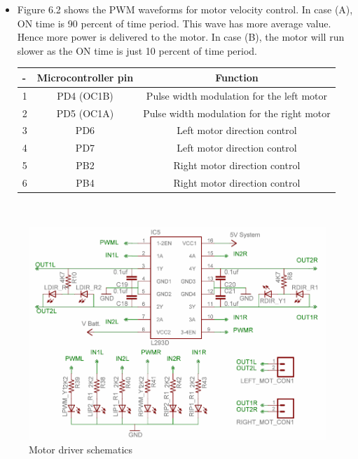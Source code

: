 \documentclass[a4paper,12pt,oneside]{book}
\begin{document}
	\begin{itemize}
	\item {Figure 6.2 shows the PWM waveforms for motor velocity control. In case (A), ON time is 90 percent of time period. This wave has more average value. Hence more power is delivered to the
	motor. In case (B), the motor will run slower as the ON time is just 10 percent of time period.}

	\begin{tabular*}{\textwidth}{|l|c|c|}
	\hline
	- & Microcontroller pin & Function \\
	\hline
	1 & PD4 (OC1B) & Pulse width modulation for the left motor\\
	\hline
	2 & PD5 (OC1A) & Pulse width modulation for the right motor\\
	\hline
	3 & PD6 & Left motor direction control \\
	\hline
	4 & PD7 & Left motor direction control \\
	\hline
	5 & PB2 & Right motor direction control \\
	\hline
	6 & PB4 & Right motor direction control \\
	\hline
	\end{tabular*}

	\end{itemize}
	\newpage
	\hfill\\
	\begin{figure}[h!]
		\centering\includegraphics[width=\textwidth]{./HardwareManual/l293d.png}
		\caption{Motor driver schematics}
	\end{figure}
	\hfill\\
\end{document}
